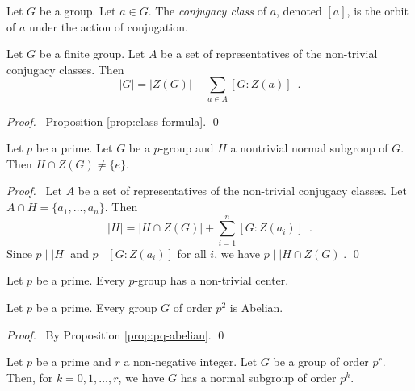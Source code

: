 \begin{df}
Let $G$ be a group. Let $a \in G$. The \emph{conjugacy class} of $a$, denoted $[a]$, is the orbit of $a$ under the action of conjugation.
\end{df}

\begin{prop}
Let $G$ be a finite group. Let $A$ be a set of representatives of the non-trivial conjugacy classes. Then
\[ |G| = |Z(G)| + \sum_{a \in A} [G : Z(a)] \enspace . \]
\end{prop}

\begin{proof}
\pf\ Proposition \ref{prop:class-formula}. \qed
\end{proof}

\begin{cor}
Let $p$ be a prime. Let $G$ be a $p$-group and $H$ a nontrivial normal subgroup of $G$. Then $H \cap Z(G) \neq \{e\}$.
\end{cor}

\begin{proof}
\pf\ Let $A$ be a set of representatives of the non-trivial conjugacy classes. Let $A \cap H = \{a_1, \ldots, a_n\}$. Then
\[ |H| = |H \cap Z(G)| + \sum_{i=1}^n [G : Z(a_i)] \enspace . \]
Since $p \mid |H|$ and $p \mid [G : Z(a_i)]$ for all $i$, we have $p \mid |H \cap Z(G)|$. \qed
\end{proof}

\begin{cor}
\label{cor:p-group-non-trivial-center}
Let $p$ be a prime.
Every $p$-group has a non-trivial center.
\end{cor}

\begin{cor}
Let $p$ be a prime. Every group $G$ of order $p^2$ is Abelian.
\end{cor}

\begin{proof}
\pf\ By Proposition \ref{prop:pq-abelian}. \qed
\end{proof}

\begin{prop}
Let $p$ be a prime and $r$ a non-negative integer. Let $G$ be a group of order $p^r$. Then, for $k = 0, 1, \ldots, r$, we have $G$ has a normal subgroup of order $p^k$.
\end{prop}

